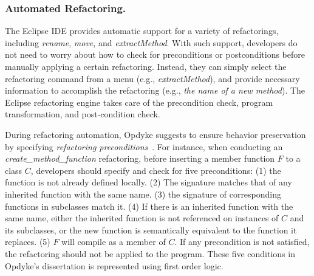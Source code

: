 \subsubsection{Automated Refactoring.} 
\label{sec:automatedrefactoring} 

The Eclipse IDE provides automatic support for a variety of refactorings, including \emph{rename}, \emph{move}, and \emph{extractMethod}. With such support, developers do not need to worry about how to check for preconditions or postconditions before manually applying a certain refactoring. Instead, they can simply select the refactoring command from a menu (e.g., \emph{extractMethod}), and provide necessary information to accomplish the refactoring (e.g., \emph{the name of a new method}). The Eclipse refactoring engine takes care of the precondition check, program transformation, and post-condition check. 

During refactoring automation, Opdyke suggests to ensure behavior preservation by specifying \emph{refactoring preconditions}~\cite{Opdyke1992:ROF}. For instance, when conducting an \emph{create\_method\_function} refactoring, before inserting a member function $F$ to a class $C$, developers should specify and check for five preconditions: (1) the function is not already defined locally. (2) The signature matches that of any inherited function with the same name. (3) the signature of corresponding functions in subclasses match it. (4) If there is an inherited function with the same name, either the inherited function is not referenced on instances of $C$ and its subclasses, or the new function is semantically equivalent to the function it replaces. (5) $F$ will compile as a member of $C$. If any precondition is not satisfied, the refactoring should not be applied to the program. These five conditions in Opdyke's dissertation is represented using first order logic. 




